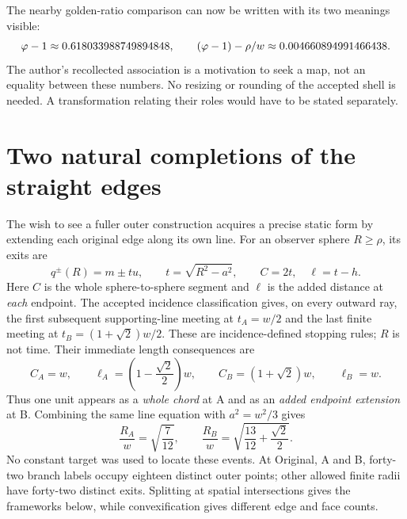 The nearby golden-ratio comparison can now be written with its two meanings visible:
\begin{equation}\label{eq:golden-gap}
\varphi-1\approx0.618033988749894848,\qquad
(\varphi-1)-\rho/w\approx0.004660894991466438 .
\end{equation}
The author's recollected association is a motivation to seek a map, not an equality between these numbers. No resizing or rounding of the accepted shell is needed. A transformation relating their roles would have to be stated separately.~\cite{Intent,TSZReview}

\section{Two natural completions of the straight edges}
The wish to see a fuller outer construction acquires a precise static form by extending each original edge along its own line. For an observer sphere $R\geq\rho$, its exits are
\begin{equation}\label{eq:line}
q^{\pm}(R)=m\pm tu,\qquad t=\sqrt{R^2-a^2},\qquad
C=2t,\quad \ell=t-h.
\end{equation}
Here $C$ is the whole sphere-to-sphere segment and $\ell$ is the added distance at \emph{each} endpoint. The accepted incidence classification gives, on every outward ray, the first subsequent supporting-line meeting at $t_A=w/2$ and the last finite meeting at $t_B=(1+\sqrt2)w/2$. These are incidence-defined stopping rules; $R$ is not time. Their immediate length consequences are
\begin{equation}\label{eq:units}
C_A=w,\qquad \ell_A=\left(1-\frac{\sqrt2}{2}\right)w,
\qquad C_B=(1+\sqrt2)w,\qquad \ell_B=w.
\end{equation}
Thus one unit appears as a \emph{whole chord} at A and as an \emph{added endpoint extension} at B. Combining the same line equation with $a^2=w^2/3$ gives
\begin{equation}\label{eq:events}
\frac{R_A}{w}=\sqrt{\frac7{12}},\qquad
\frac{R_B}{w}=\sqrt{\frac{13}{12}+\frac{\sqrt2}{2}}.
\end{equation}
No constant target was used to locate these events. At Original, A and B, forty-two branch labels occupy eighteen distinct outer points; other allowed finite radii have forty-two distinct exits. Splitting at spatial intersections gives the frameworks below, while convexification gives different edge and face counts.~\cite[Secs.~5, 8--10]{SP}


